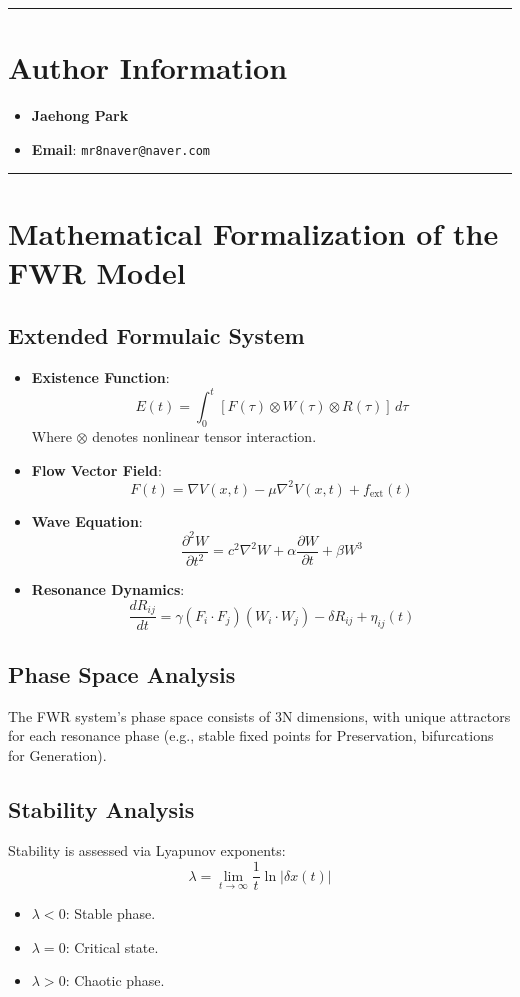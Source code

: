 \documentclass{article}
\begin{document}
\hrule

\section*{Author Information}
\begin{itemize}
    \item \textbf{Jaehong Park}
    \item \textbf{Email}: \texttt{mr8naver@naver.com}
\end{itemize}

\hrule

\appendix
\section{Mathematical Formalization of the FWR Model}

\subsection{Extended Formulaic System}
\begin{itemize}
    \item \textbf{Existence Function}:
    $$
    E(t) = \int_{0}^{t} [F(\tau) \otimes W(\tau) \otimes R(\tau)] \, d\tau
    $$
    Where $\otimes$ denotes nonlinear tensor interaction.
    \item \textbf{Flow Vector Field}:
    $$
    F(t) = \nabla V(x,t) - \mu \nabla^2 V(x,t) + f_{\text{ext}}(t)
    $$
    \item \textbf{Wave Equation}:
    $$
    \frac{\partial^2 W}{\partial t^2} = c^2 \nabla^2 W + \alpha \frac{\partial W}{\partial t} + \beta W^3
    $$
    \item \textbf{Resonance Dynamics}:
    $$
    \frac{dR_{ij}}{dt} = \gamma (F_i \cdot F_j)(W_i \cdot W_j) - \delta R_{ij} + \eta_{ij}(t)
    $$
\end{itemize}

\subsection{Phase Space Analysis}
The FWR system’s phase space consists of 3N dimensions, with unique attractors for each resonance phase (e.g., stable fixed points for Preservation, bifurcations for Generation).

\subsection{Stability Analysis}
Stability is assessed via Lyapunov exponents:
$$
\lambda = \lim_{t \to \infty} \frac{1}{t} \ln |\delta x(t)|
$$
\begin{itemize}
    \item $\lambda < 0$: Stable phase.
    \item $\lambda = 0$: Critical state.
    \item $\lambda > 0$: Chaotic phase.
\end{itemize}
\end{document}
